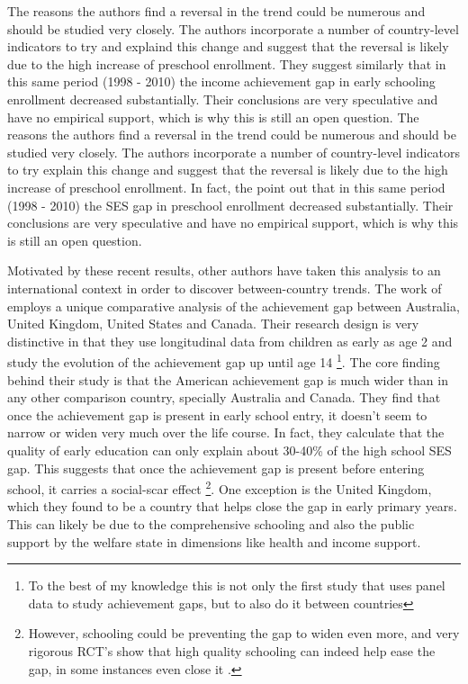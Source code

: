 \documentclass[11pt, a4paper]{article}\usepackage[]{graphicx}\usepackage[]{color}
\begin{document}
The reasons the authors find a reversal in the trend could be numerous and should be studied very closely. The authors incorporate a number of country-level indicators to try and explaind this change and suggest that the reversal is likely due to the high increase of preschool enrollment. They suggest similarly that in this same period (1998 - 2010) the income achievement gap in early schooling enrollment decreased substantially. Their conclusions are very speculative and have no empirical support, which is why this is still an open question.
The reasons the authors find a reversal in the trend could be numerous and should be studied very closely. The authors incorporate a number of country-level indicators to try explain this change and suggest that the reversal is likely due to the high increase of preschool enrollment. In fact, the point out that in this same period (1998 - 2010) the SES gap in preschool enrollment decreased substantially. Their conclusions are very speculative and have no empirical support, which is why this is still an open question.


Motivated by these recent results, other authors have taken this analysis to an international context in order to discover between-country trends. The work of \citet{bradbury2015} employs a unique comparative analysis of the achievement gap between Australia, United Kingdom, United States and Canada. Their research design is very distinctive in that they use longitudinal data from children as early as age 2 and study the evolution of the achievement gap up until age 14 \footnote{To the best of my knowledge this is not only the first study that uses panel data to study achievement gaps, but to also do it between countries}. The core finding behind their study is that the American achievement gap is much wider than in any other comparison country, specially Australia and Canada. They find that once the achievement gap is present in early school entry, it doesn't seem to narrow or widen very much over the life course. In fact, they calculate that the quality of early education can only explain about  30-40\% of the high school SES gap. This suggests that once the achievement gap is present before entering school, it carries a social-scar effect \footnote{However, schooling could be preventing the gap to widen even more, and very rigorous RCT's show that high quality schooling can indeed help ease the gap, in some instances even close it \citep{campbell2002}.}. One exception is the United Kingdom, which they found to be a country that helps close the gap in early primary years. This can likely be due to the comprehensive schooling and also the public support by the welfare state in dimensions like health and income support.
\end{document}
